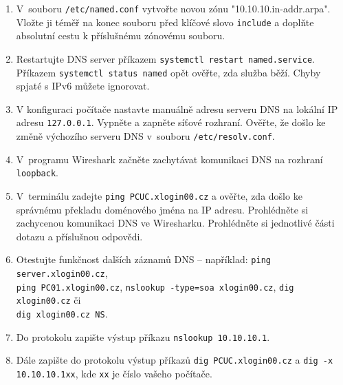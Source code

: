 \begin{enumerate}
  \item V~souboru {\tt /etc/named.conf} vytvořte novou zónu "10.10.10.in-addr.arpa". Vložte ji téměř na konec souboru před klíčové slovo {\tt include} a doplňte absolutní cestu k příslušnému zónovému souboru.
  
  \item Restartujte DNS server příkazem {\tt systemctl restart named.service}.
    Příkazem {\tt systemctl status named} opět ověřte, zda služba běží. Chyby spjaté s IPv6 můžete ignorovat.

  \item V konfiguraci počítače nastavte manuálně adresu serveru DNS na lokální IP adresu {\tt 127.0.0.1}. Vypněte a zapněte síťové rozhraní. Ověřte, že došlo ke změně výchozího serveru DNS v~souboru {\tt /etc/resolv.conf}.
  \item V~programu Wireshark začněte zachytávat  komunikaci DNS na rozhraní {\tt loopback}.
  \item V~terminálu zadejte {\tt ping PCUC.xlogin00.cz} a ověřte, zda došlo ke správnému překladu doménového jména na IP adresu. Prohlédněte si zachycenou komunikaci DNS ve Wiresharku. Prohlédněte si jednotlivé části dotazu a příslušnou odpovědi.
  \item Otestujte funkčnost dalších záznamů DNS -- například:  {\tt ping server.xlogin00.cz},\\
    {\tt ping PC01.xlogin00.cz}, {\tt nslookup -type=soa xlogin00.cz}, {\tt dig xlogin00.cz} či \\
    {\tt dig xlogin00.cz NS}. 
  \item Do protokolu zapište výstup příkazu {\tt nslookup 10.10.10.1}.
  \item Dále zapište do protokolu výstup příkazů {\tt dig PCUC.xlogin00.cz} a {\tt dig -x 10.10.10.1xx}, kde {\tt xx} je číslo vašeho počítače.

\end{enumerate}
